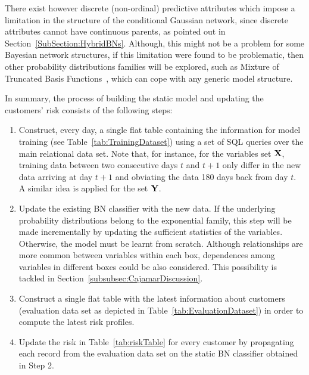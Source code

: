 There exist however discrete (non-ordinal) predictive attributes which impose a limitation in the structure of the conditional Gaussian network, since discrete attributes cannot have continuous parents, as pointed out in Section~\ref{SubSection:HybridBNs}. 
Although, this might not be a problem for some Bayesian network structures, if this limitation were found to be problematic, then other probability distributions families will be explored, such as Mixture of Truncated Basis Functions~\cite{Langseth12}, which can cope with any generic model structure. 

In summary, the process of building the static model and updating the customers' risk consists of the following steps:

\begin{enumerate}
\item Construct, every day, a single flat table containing the information for model training (see Table~\ref{tab:TrainingDataset}) using a set of SQL queries over the main relational data set. Note that, for instance, for the variables set $\mathbf{X}$, training data between two consecutive days $t$ and $t+1$ only differ in the new data arriving at day $t+1$ and obviating the data 180 days back from day $t$. A similar idea is applied for the set $\mathbf{Y}$.
\item Update the existing BN classifier with the new data. If the underlying probability distributions belong to the exponential family, this step will be made incrementally by updating the sufficient statistics of the variables. Otherwise, the model must be learnt from scratch. Although relationships are more common between variables within each box, dependences among variables in different boxes could be also considered. This possibility is tackled in Section~\ref{subsubsec:CajamarDiscussion}.
\item Construct a single flat table with the latest information about customers (evaluation data set as depicted in Table~\ref{tab:EvaluationDataset}) in order to compute the latest risk profiles. 
\item Update the risk in Table~\ref{tab:riskTable} for every customer by propagating each record from the evaluation data set on the static BN classifier obtained in Step 2.
\end{enumerate}

